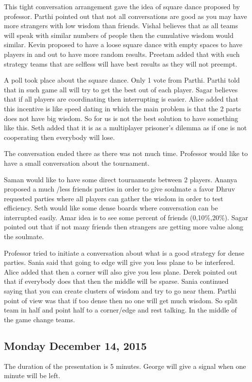 This tight conversation arrangement gave the idea of square dance proposed by professor.
Parthi pointed out that not all conversations are good as you may have more strangers with low wisdom than friends.
Vishal believes that as all teams will speak with similar numbers of people then the cumulative wisdom would similar.
Kevin proposed to have a loose square dance with empty spaces to have players in and out to have more random results.
Preetam added that with such strategy teams that are selfless will have best results as they will not preempt.

A poll took place about the square dance.
Only 1 vote from Parthi.
Parthi told that in such game all will try to get the best out of each player.
Sagar believes that if all players are coordinating then interrupting is easier.
Alice added that this incentive is like speed dating in which the main problem is that the 2 parts does not have big wisdom. So for us is not the best solution to have something like this.
Seth added that it is as a multiplayer prisoner’s dilemma as if one is not cooperating then everybody will lose.

The conversation ended there as there was not much time. Professor would like to have a small conversation about the tournament.

Saman would like to have some direct tournaments between 2 players.
Ananya proposed a much /less friends parties in order to give soulmate a favor
Dhruv requested parties where all players can gather the wisdom in order to test efficiency.
Seth would like some dense boards where conversation can be interrupted easily.
Amar idea is to see some percent of friends (0,10\%,20\%).
Sagar pointed out that if not many friends then strangers are getting more value along the soulmate.

Professor tried to initiate a conversation about what is a good strategy for dense parties.
Sania said that going to edge will give you less plane to be interfered.
Alice added that then a corner will also give you less plane.
Derek pointed out that if everybody does that then the middle will be sparse.
Sania continued saying that you can create clusters of wisdom and try to go near them.
Parthi point of view was that if too dense then no one will get much wisdom. So 
split team in half and point half to a corner/edge and rest talking. In the middle 
of the game change teams.

\subsection{Monday December 14, 2015}
The duration of the presentation is 5 minutes. George will give a signal when one
minute will be left.

